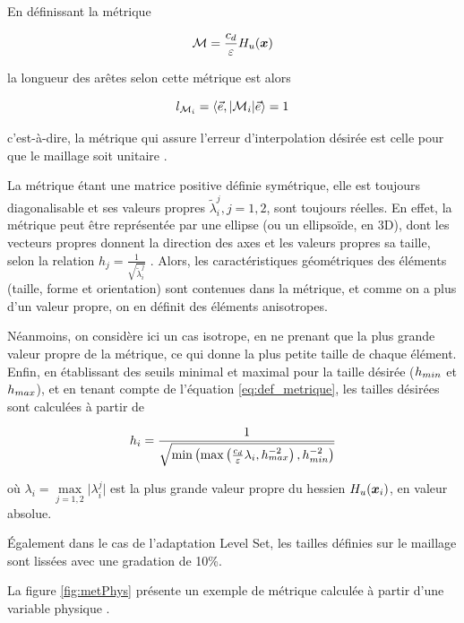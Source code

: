 \indent En définissant la métrique

\begin{equation}
	\label{eq:def_metrique}
	\mathcal{M} = \frac{c_d}{\varepsilon}H_u(\boldsymbol{x})
\end{equation}

\noindent la longueur des arêtes selon cette métrique est alors

\begin{equation*}
	l_{\mathcal{M}_i} = \langle \vec{e}, |\mathcal{M}_i| \vec{e} \rangle = 1
\end{equation*}

\noindent c'est-à-dire, la métrique qui assure l'erreur d'interpolation désirée est celle pour que le maillage soit unitaire \cite{cecile_these,frey_alauzet}.

\indent La métrique étant une matrice positive définie symétrique, elle est toujours diagonalisable et ses valeurs propres \(\tilde{\lambda}_i^j, j=1,2\), sont toujours réelles. En effet, la métrique peut être représentée par une ellipse (ou un ellipsoïde, en 3D), dont les vecteurs propres donnent la direction des axes et les valeurs propres sa taille, selon la relation \(h_j =  \frac{1}{\sqrt{\tilde{\lambda}_i^j}}\) \cite{leo}. Alors, les caractéristiques géométriques des éléments (taille, forme et orientation) sont contenues dans la métrique, et comme on a plus d'un valeur propre, on en définit des éléments anisotropes.

\indent Néanmoins, on considère ici un cas isotrope, en ne prenant que la plus grande valeur propre de la métrique, ce qui donne la plus petite taille de chaque élément. Enfin, en établissant des seuils minimal et maximal pour la taille désirée (\(h_{min}\) et \(h_{max}\)), et en tenant compte de l'équation \eqref{eq:def_metrique}, les tailles désirées sont calculées à partir de

\begin{equation*}
	h_i = \frac{1}{\sqrt{\min\left(\max\left(\frac{c_d}{\varepsilon}\lambda_i,h_{max}^{-2}\right),h_{min}^{-2}\right)}}
\end{equation*}

\noindent où \(\lambda_i = \max\limits_{j=1,2}{|\lambda_i^j}|\) est la plus grande valeur propre du hessien \(H_u(\boldsymbol{x}_i) \), en valeur absolue.

\indent Également dans le cas de l'adaptation Level Set, les tailles définies sur le maillage sont lissées avec une gradation de 10\%.

\indent La figure \ref{fig:metPhys} présente un exemple de métrique calculée à partir d'une variable physique .

